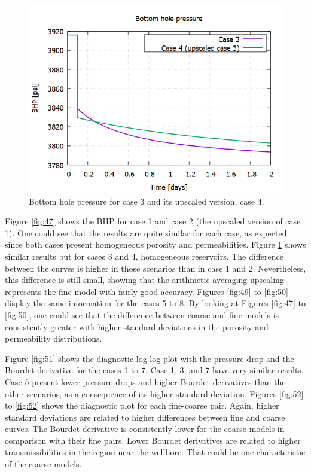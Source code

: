 \begin{figure}[H]
	\centering
	\includegraphics[width=0.8\linewidth]{Images/48}
	\caption{Bottom hole pressure for case 3 and its upscaled version, case 4.}
	\label{fig:48}
\end{figure}

Figure \ref{fig:47} shows the BHP for case 1 and case 2 (the upscaled version of case 1). One could see that the results are quite similar for each case, as expected since both cases present homogeneous porosity and permeabilities. Figure \ref{fig:48} shows similar results but for cases 3 and 4, homogeneous reservoirs. The difference between the curves is higher in those scenarios than in case 1 and 2. Nevertheless, this difference is still small, showing that the arithmetic-averaging upscaling represents the fine model with fairly good accuracy. Figures \ref{fig:49} to \ref{fig:50} display the same information for the cases 5 to 8. By looking at Figures \ref{fig:47} to \ref{fig:50}, one could see that the difference between coarse and fine models is consistently greater with higher standard deviations in the porosity and permeability distributions. 

Figure \ref{fig:51} shows the diagnostic log-log plot with the pressure drop and the Bourdet derivative for the cases 1 to 7. Case 1, 3, and 7 have very similar results. Case 5 present lower pressure drops and higher Bourdet derivatives than the other scenarios, as a consequence of its higher standard deviation. Figures \ref{fig:52} to \ref{fig:52} shows the diagnostic plot for each fine-coarse pair. Again, higher standard deviations are related to higher differences between fine and coarse curves. The Bourdet derivative is consistently lower for the coarse models in comparison with their fine pairs. Lower Bourdet derivatives are related to higher transmissibilities in the region near the wellbore. That could be one characteristic of the coarse models. 

